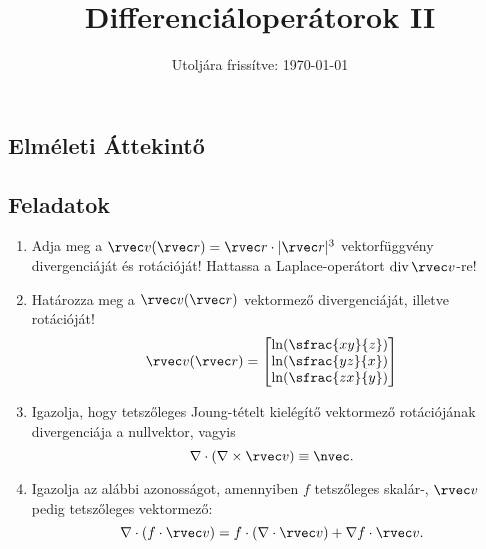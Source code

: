 \documentclass[a4paper, 12pt]{scrartcl}
\title{Differenciáloperátorok II}
\date{Utoljára frissítve: \today}
\begin{document}
\maketitle

\subsection{Elméleti Áttekintő}

\clearpage
\subsection{Feladatok}

\begin{enumerate}
  \item Adja meg a $\rvec v(\rvec r) = \rvec r \cdot |\rvec r|^3$ vektorfüggvény
        divergenciáját és rotációját! Hattassa a Laplace-operátort
        $\operatorname{div} \rvec v$-re!

  \item Határozza meg a $\rvec v(\rvec r)$ vektormező divergenciáját, illetve
        rotációját!
        $$
          \rvec v(\rvec r) = \begin{bmatrix}
            \ln(\sfrac{xy}{z}) \\
            \ln(\sfrac{yz}{x}) \\
            \ln(\sfrac{zx}{y}) \\
          \end{bmatrix}
        $$

  \item Igazolja, hogy tetszőleges Joung-tételt kielégítő vektormező
        rotációjának divergenciája a nullvektor, vagyis
        $$
          \nabla \cdot (\nabla \times \rvec v) \equiv \nvec
          \text.
        $$

  \item Igazolja az alábbi azonosságot, amennyiben $f$ tetszőleges skalár-,
        $\rvec v$ pedig tetszőleges vektormező:
        $$
          \nabla \cdot (f \cdot \rvec v)
          = f \cdot (\nabla \cdot \rvec v)
          + \nabla f \cdot \rvec v
          \text.
        $$
\end{enumerate}
\end{document}
